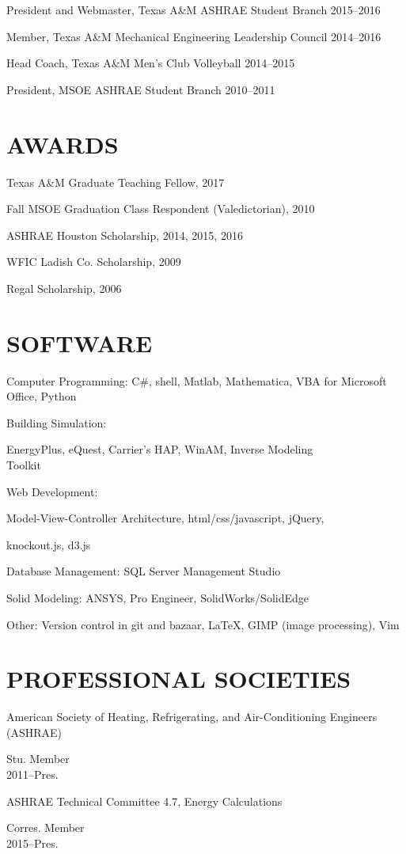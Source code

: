 \documentclass[margin]{res} %
\begin{document}
\begin{resume}
President and Webmaster, Texas A\&M ASHRAE Student Branch \hfill 2015--2016

Member, Texas A\&M Mechanical Engineering Leadership Council \hfill 2014--2016

Head Coach, Texas A\&M Men's Club Volleyball \hfill 2014--2015\

President, MSOE ASHRAE Student Branch \hfill 2010--2011

\section{AWARDS}
Texas A\&M Graduate Teaching Fellow, 2017

Fall MSOE Graduation Class Respondent (Valedictorian), 2010

ASHRAE Houston Scholarship, 2014, 2015, 2016

WFIC Ladish Co. Scholarship, 2009

Regal Scholarship, 2006

\section{SOFTWARE}

Computer Programming: C\#, shell, Matlab, Mathematica, VBA for Microsoft Office, Python

Building Simulation: \parbox[t]{16cm}{ EnergyPlus, eQuest, Carrier's
HAP, WinAM, Inverse Modeling \\ Toolkit }

Web Development: \parbox[t]{20cm}{Model-View-Controller Architecture,
html/css/javascript, jQuery,\par knockout.js, d3.js}

Database Management: SQL Server Management Studio

Solid Modeling: ANSYS, Pro Engineer, SolidWorks/SolidEdge

Other: Version control in git and bazaar, \LaTeX, GIMP (image processing), Vim

\section{PROFESSIONAL SOCIETIES}

\parbox[t]{9cm}{American Society of Heating, Refrigerating, and Air-Conditioning Engineers (ASHRAE)} \hfill \parbox[t]{3cm}{\raggedleft Stu. Member \\ 2011--Pres.}

\parbox[t]{9cm}{ASHRAE Technical Committee 4.7, Energy Calculations }\hfill \parbox[t]{3cm}{\raggedleft Corres. Member \\ 2015--Pres.}


\end{resume}
\end{document}

